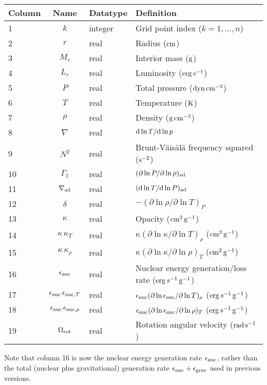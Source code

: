 \documentclass{article}
\newcommand{\diff}{\ensuremath{{\rm d}}}
\newcommand{\cm}{\ensuremath{{\rm cm}}}
\newcommand{\gram}{\ensuremath{{\rm g}}}
\newcommand{\second}{\ensuremath{{\rm s}}}
\newcommand{\dyne}{\ensuremath{{\rm dyn}}}
\newcommand{\erg}{\ensuremath{{\rm erg}}}
\newcommand{\kelvin}{\ensuremath{{\rm K}}}
\begin{document}
\begin{table}[h!]
\begin{tabular}{|l|c|l|l|} \hline
Column & Name & Datatype & Definition \\ \hline
1      & $k$ & integer & Grid point index ($k=1,\ldots,n$) \\
2      & $r$ & real    & Radius ($\cm$) \\
3      & $M_{r}$ & real  & Interior mass ($\gram$) \\
4      & $L_{r}$ & real & Luminosity ($\erg\,\second^{-1}$) \\
5      & $P$ & real    & Total pressure ($\dyne\,\cm^{-2}$) \\
6      & $T$ & real    & Temperature ($\kelvin$) \\
7      & $\rho$ & real & Density ($\gram\,\cm^{-3}$) \\
8      & $\nabla$ & real & $\diff \ln T/\diff \ln p$ \\
9      & $N^{2}$ & real & Brunt-V\"ais\"al\"a frequency squared ($\second^{-2}$) \\
10     & $\Gamma_{1}$ & real & $(\partial \ln P/\partial \ln \rho)_{\rm ad}$ \\
11     & $\nabla_{\rm ad}$ & real & $(\diff \ln T/\diff \ln P)_{\rm ad}$ \\
12     & $\delta$ & real & $-(\partial \ln \rho/\partial \ln T)_{P}$  \\
13     & $\kappa$ & real & Opacity ($\cm^{2}\,\gram^{-1}$) \\
14     & $\kappa\,\kappa_{T}$ & real & $\kappa (\partial \ln \kappa/\partial \ln T)_{\rho}$ ($\cm^{2}\,\gram^{-1}$) \\
15     & $\kappa\,\kappa_{\rho}$ & real & $\kappa (\partial \ln \kappa/\partial \ln \rho)_{T}$ ($\cm^{2}\,\gram^{-1}$) \\
16     & $\epsilon_{\rm nuc}$ & real & Nuclear energy generation/loss rate ($\erg\,s^{-1}\,\gram^{-1}$) \\
17     & $\epsilon_{\rm nuc}\,\epsilon_{{\rm nuc},T}$ & real & $\epsilon_{\rm nuc} (\partial \ln \epsilon_{\rm nuc}/\partial \ln T)_{\rho}$ ($\erg\,s^{-1}\,\gram^{-1}$) \\
18     & $\epsilon_{\rm nuc}\,\epsilon_{{\rm nuc},\rho}$ & real & $\epsilon_{\rm nuc} (\partial \ln \epsilon_{\rm nuc}/\partial \ln \rho)_{T}$ ($\erg\,s^{-1}\,\gram^{-1}$) \\
19     & $\Omega_{\rm rot}$ & real & Rotation angular velocity (${\rm rad}\,\second^{-1}$) \\  \hline
\end{tabular}
\end{table}

Note that column 16 is now the nuclear energy generation rate
$\epsilon_{\rm nuc}$, rather than the total (nuclear plus
gravitational) generation rate $\epsilon_{\rm nuc} + \epsilon_{\rm
  grav}$ used in previous versions.
\end{document}
